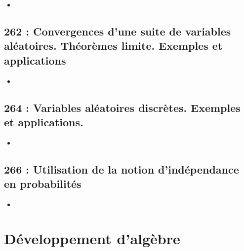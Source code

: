 \documentclass[a4paper,10pt,oneside,twocolumn,landscape]{book}
\begin{document}
\begin{itemize}
	\item 
\end{itemize}

\section{262 : Convergences d’une suite de variables aléatoires. Théorèmes limite. Exemples et applications}

\begin{itemize}
	\item 
\end{itemize}


\section{264 : Variables aléatoires discrètes. Exemples et applications.}

\begin{itemize}
	\item 
\end{itemize}


\section{266 : Utilisation de la notion d’indépendance en probabilités}

\begin{itemize}
\item 
\end{itemize}




\setcounter{secnumdepth}{1} %



\onecolumn

\chapter{Développement d'algèbre}

\twocolumn




\end{document}

